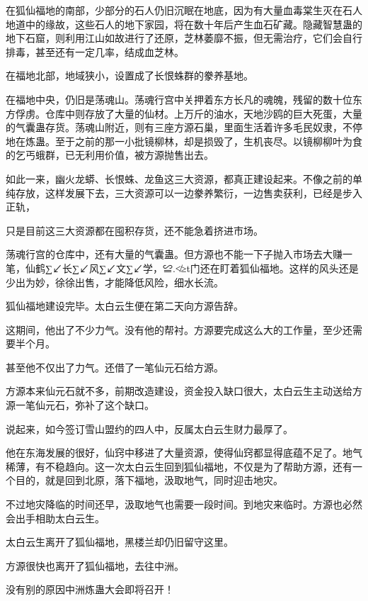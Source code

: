 
\begin{this_body}

在狐仙福地的南部，少部分的石人仍旧沉眠在地底，因为有大量血毒棠生灭在石人地道中的缘故，这些石人的地下家园，将在数十年后产生血石矿藏。隐藏智慧蛊的地下石窟，则利用江山如故进行了还原，芝林萎靡不振，但无需治疗，它们会自行排毒，甚至还有一定几率，结成血芝林。

在福地北部，地域狭小，设置成了长恨蛛群的豢养基地。

在福地中央，仍旧是荡魂山。荡魂行宫中关押着东方长凡的魂魄，残留的数十位东方俘虏。仓库中则存放了大量的仙材。上万斤的油水，天地沙鸥的巨大死蛋，大量的气囊蛊存货。荡魂山附近，则有三座方源石巢，里面生活着许多毛民奴隶，不停地在炼蛊。至于之前的那一小批镜柳林，却是损毁了，生机丧尽。以镜柳柳叶为食的乞丐蛾群，已无利用价值，被方源抛售出去。

如此一来，幽火龙蟒、长恨蛛、龙鱼这三大资源，都真正建设起来。不像之前的单纯存放，这样发展下去，三大资源可以一边豢养繁衍，一边售卖获利，已经是步入正轨，

只是目前这三大资源都在囤积存货，还不能急着挤进市场。

荡魂行宫的仓库中，还有大量的气囊蛊。但方源也不能一下子抛入市场去大赚一笔，仙鹤∑↙长∑↙风∑↙文∑↙学，≌.≮≥t门还在盯着狐仙福地。这样的风头还是少出为妙，徐徐出售，才能降低风险，细水长流。

狐仙福地建设完毕。太白云生便在第二天向方源告辞。

这期间，他出了不少力气。没有他的帮衬。方源要完成这么大的工作量，至少还需要半个月。

甚至他不仅出了力气。还借了一笔仙元石给方源。

方源本来仙元石就不多，前期改造建设，资金投入缺口很大，太白云生主动送给方源一笔仙元石，弥补了这个缺口。

说起来，如今签订雪山盟约的四人中，反属太白云生财力最厚了。

他在东海发展的很好，仙窍中移进了大量资源，使得仙窍都显得底蕴不足了。地气稀薄，有不稳趋向。这一次太白云生回到狐仙福地，不仅是为了帮助方源，还有一个目的，就是回到北原，落下福地，汲取地气，同时迎击地灾。

不过地灾降临的时间还早，汲取地气也需要一段时间。到地灾来临时。方源也必然会出手相助太白云生。

太白云生离开了狐仙福地，黑楼兰却仍旧留守这里。

方源很快也离开了狐仙福地，去往中洲。

没有别的原因中洲炼蛊大会即将召开！


\end{this_body}
